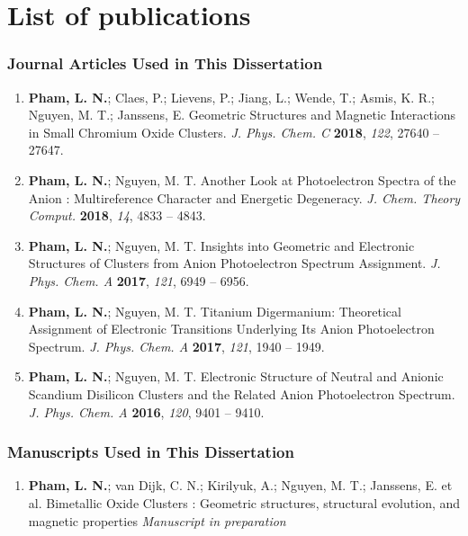 
\chapter{List of publications}

\subsection*{Journal Articles Used in This Dissertation}

\begin{enumerate}
    \item \textbf{Pham, L. N.}; Claes, P.; Lievens, P.; Jiang, L.; Wende, T.; Asmis, K. R.; Nguyen, M. T.; Janssens, E. Geometric Structures and Magnetic Interactions in Small Chromium Oxide Clusters. \textit{J. Phys. Chem. C} \textbf{2018}, \textit{122}, 27640 -- 27647.
    \item \textbf{Pham, L. N.}; Nguyen, M. T. Another Look at Photoelectron Spectra of the Anion : Multireference Character and Energetic Degeneracy. \textit{J. Chem. Theory Comput.} \textbf{2018}, \textit{14}, 4833 -- 4843.   
    \item \textbf{Pham, L. N.}; Nguyen, M. T. Insights into Geometric and Electronic Structures of  Clusters from Anion Photoelectron Spectrum Assignment. \textit{J. Phys. Chem. A} \textbf{2017}, \textit{121}, 6949 -- 6956.
    \item \textbf{Pham, L. N.}; Nguyen, M. T. Titanium Digermanium: Theoretical Assignment of Electronic Transitions Underlying Its Anion Photoelectron Spectrum. \textit{J. Phys. Chem. A} \textbf{2017}, \textit{121}, 1940 -- 1949.
    \item \textbf{Pham, L. N.}; Nguyen, M. T. Electronic Structure of Neutral and Anionic Scandium Disilicon  Clusters and the Related Anion Photoelectron Spectrum. \textit{J. Phys. Chem. A} \textbf{2016}, \textit{120}, 9401 -- 9410.
\end{enumerate}

\subsection*{Manuscripts Used in This Dissertation}

\begin{enumerate}
    \item \textbf{Pham, L. N.}; van Dijk, C. N.; Kirilyuk,  A.; Nguyen, M. T.; Janssens, E. et al. Bimetallic Oxide Clusters : Geometric structures, structural evolution, and magnetic properties \textit{Manuscript in preparation}
\end{enumerate}

